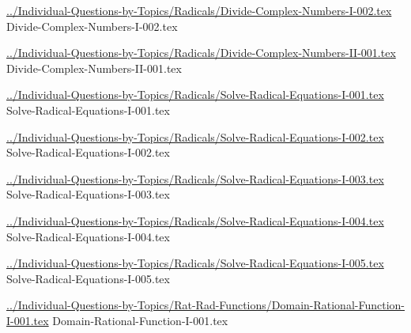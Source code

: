 \documentclass[answer,cancelspace,12pt]{exam}
\begin{document}
\begin{questions}
\question
\href{../Individual-Questions-by-Topics/Radicals/Divide-Complex-Numbers-I-002.tex}{../Individual-Questions-by-Topics/Radicals/Divide-Complex-Numbers-I-002.tex}
{Divide-Complex-Numbers-I-002.tex}

\question
\href{../Individual-Questions-by-Topics/Radicals/Divide-Complex-Numbers-II-001.tex}{../Individual-Questions-by-Topics/Radicals/Divide-Complex-Numbers-II-001.tex}
{Divide-Complex-Numbers-II-001.tex}

\question
\href{../Individual-Questions-by-Topics/Radicals/Solve-Radical-Equations-I-001.tex}{../Individual-Questions-by-Topics/Radicals/Solve-Radical-Equations-I-001.tex}
{Solve-Radical-Equations-I-001.tex}


\question
\href{../Individual-Questions-by-Topics/Radicals/Solve-Radical-Equations-I-002.tex}{../Individual-Questions-by-Topics/Radicals/Solve-Radical-Equations-I-002.tex}
{Solve-Radical-Equations-I-002.tex}


\question
\href{../Individual-Questions-by-Topics/Radicals/Solve-Radical-Equations-I-003.tex}{../Individual-Questions-by-Topics/Radicals/Solve-Radical-Equations-I-003.tex}
{Solve-Radical-Equations-I-003.tex}

\question
\href{../Individual-Questions-by-Topics/Radicals/Solve-Radical-Equations-I-004.tex}{../Individual-Questions-by-Topics/Radicals/Solve-Radical-Equations-I-004.tex}
{Solve-Radical-Equations-I-004.tex}

\question
\href{../Individual-Questions-by-Topics/Radicals/Solve-Radical-Equations-I-005.tex}{../Individual-Questions-by-Topics/Radicals/Solve-Radical-Equations-I-005.tex}
{Solve-Radical-Equations-I-005.tex}


\question
\href{../Individual-Questions-by-Topics/Rat-Rad-Functions/Domain-Rational-Function-I-001.tex}{../Individual-Questions-by-Topics/Rat-Rad-Functions/Domain-Rational-Function-I-001.tex}
{Domain-Rational-Function-I-001.tex}


\end{questions}
\end{document}
